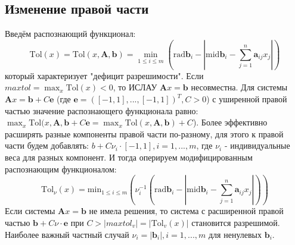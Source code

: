 \documentclass[a4paper,12pt]{article}
\begin{document}
    \subsection{Изменение правой части}
    Введём распознающий функционал:
    \begin{equation}
        \text{Tol}(x) = \text{Tol}(x, \textbf{A}, \textbf{b}) = \min_{1 \leq i \leq m}(\text{rad}\textbf{b}_{i} - | \text{mid}\textbf{b}_{i} - \sum_{j = 1}^{n}\textbf{a}_{ij}x_{j} |)
        \label{eq:tol}
    \end{equation}
    который характеризует "дефицит разрешимости". Если $ maxtol = \max_{x}\text{Tol}(x) < 0 $, то ИСЛАУ $ \textbf{A}x=\textbf{b} $ несовместна. \newline
    Для системы $ \textbf{A}x = \textbf{b} + C\textbf{e} $ (где $ \textbf{e} = ([-1, 1], ..., [-1, 1])^{T}, C > 0 $) с уширенной правой частью значение распознающего функционала равно:
    $ \max_{x}\text{Tol}(x, \textbf{A}, \textbf{b} + C\textbf{e} = \max_{x}\text{Tol}(x, \textbf{A}, \textbf{b}) + C $).
    \newline
    Более эффективно расширять разные компоненты правой части по-разному, для этого к правой части будем добавлять:
    $ b + C \nu_{i} \cdot[-1, 1], i = 1, ..., m $, где $ \nu_{i} $ - индивидуальные веса для разных компонент.
    И тогда оперируем модифицированным распознающим функционалом:
    \begin{equation}
        \text{Tol}_{\nu}(x) = \text{min}_{1 \leq i \leq m} (\nu_{i}^{-1}(\text{rad}\textbf{b}_{i} - | \text{mid}\textbf{b}_{i} - \sum_{j = 1}^{n}\textbf{a}_{ij}x_{j} |))
    \end{equation}
    Если системы $ \textbf{A}x = \textbf{b} $ не имела решения, то система с расширенной правой частью $ \textbf{b} + C \nu \cdot \textbf{e} $ при $ C > |maxtol_v| = |\text{Tol}_v(x) | $ становится разрешимой.
    Наиболее важный частный случай $ \nu_{i} = | \textbf{b}_{i} |, i = 1, ..., m $ для ненулевых $ \textbf{b}_{i} $.
\end{document}
